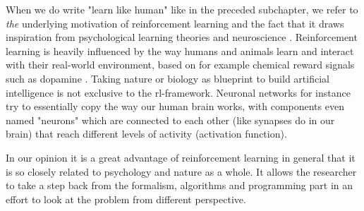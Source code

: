 When we do write "learn like human" like in the preceded subchapter, we refer to \textit{the} underlying motivation of reinforcement learning and the fact that it draws inspiration from psychological learning theories \cite[p.~341]{Sutton1998} and neuroscience \cite[p.~377]{Sutton1998}. Reinforcement learning is heavily influenced by the way humans and animals learn and interact with their real-world environment, based on for example chemical reward signals such as dopamine \cite[p.~383]{Sutton1998}. Taking nature or biology as blueprint to build artificial intelligence is not exclusive to the rl-framework. Neuronal networks for instance try to essentially copy the way our human brain works, with components even named "neurons" which are connected to each other (like synapses do in our brain) that reach different levels of activity (activation function).
\par
In our opinion it is a great advantage of reinforcement learning in general that it is so closely related to psychology and nature as a whole. It allows the researcher to take a step back from the formalism, algorithms and programming part in an effort to look at the problem from different perspective. 